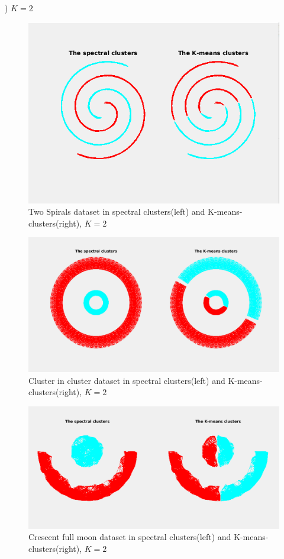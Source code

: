 \documentclass[unicode,11pt,a4paper,oneside,numbers=endperiod,openany]{scrartcl}
\begin{document}
\begin{enumerate}
) ${K=2}$
  \begin{figure}[h!]
    \begin{minipage}[c]{1\linewidth}
        \centering
        \includegraphics[width=0.6\linewidth]{./figures/twospiralcluster.png}
    \end{minipage}
  \caption{Two Spirals dataset in spectral clusters(left) and K-means-clusters(right), ${K=2}$}
\end{figure}

\begin{figure}[h!]
    \begin{minipage}[c]{1\linewidth}
        \centering
        \includegraphics[width=0.6\linewidth]{./figures/clusterincluster.png}
    \end{minipage}
  \caption{Cluster in cluster dataset in spectral clusters(left) and K-means-clusters(right), ${K=2}$}
\end{figure}

\begin{figure}[h!]
    \begin{minipage}[c]{1\linewidth}
        \centering
        \includegraphics[width=0.6\linewidth]{./figures/fullmoon.png}
    \end{minipage}
  \caption{Crescent full moon dataset in spectral clusters(left) and K-means-clusters(right), ${K=2}$}
\end{figure}


\end{enumerate}
\end{document}
